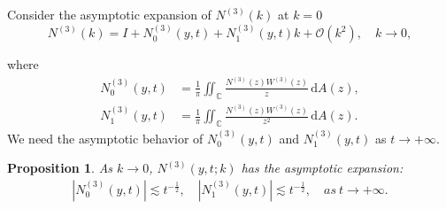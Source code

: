 \documentclass[11pt]{article}
\numberwithin{equation}{section}
\newtheorem{Proposition}{Proposition}
\begin{document}
Consider the asymptotic expansion of $N^{(3)}( k)$ at $k = 0$
\begin{equation*}
    N^{(3)}(k) = I + N^{(3)}_0(y, t) + N^{(3)}_1(y, t) k + \mathcal{O}(k^2), \quad k \to 0,
\end{equation*}

where
\begin{align*}
    N^{(3)}_0(y, t)& = \frac{1}{\pi} \iint_\mathbb{C} \frac{N^{(3)}(z) W^{(3)}(z)}{z} \, \mathrm{d}A(z),\\
    N^{(3)}_1(y, t)& = \frac{1}{\pi} \iint_\mathbb{C} \frac{N^{(3)}(z) W^{(3)}(z)}{z^2} \, \mathrm{d}A(z).
\end{align*}
 We need the asymptotic behavior of $N^{(3)}_0(y, t)$ and $N^{(3)}_1(y, t)$ as $t\to+\infty$.
\begin{Proposition}\label{p29}
As $k \to 0$, $N^{(3)}(y,t;k)$ has the asymptotic expansion:
\begin{align*}
|N^{(3)}_0(y,t)|\lesssim t^{-\frac{1}{2}},\quad |N^{(3)}_1(y,t)|\lesssim t^{-\frac{1}{2}},\quad as\ t\to + \infty.
\end{align*}
\end{Proposition}
\end{document}

